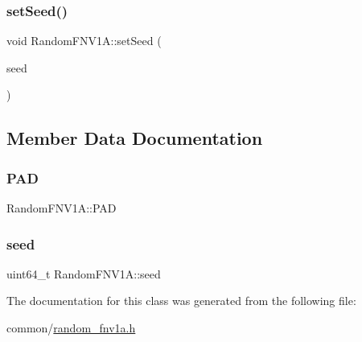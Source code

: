 \mbox{\label{classRandomFNV1A_a8fa32c70622235889cde300c7b8adb10}} 
\subsubsection{\texorpdfstring{set\+Seed()}{setSeed()}}
{\footnotesize\ttfamily void Random\+F\+N\+V1\+A\+::set\+Seed (\begin{DoxyParamCaption}\item[{uint64\+\_\+t}]{seed }\end{DoxyParamCaption})\hspace{0.3cm}{\ttfamily [inline]}}



\subsection{Member Data Documentation}
\mbox{\label{classRandomFNV1A_a587bc4df3805091170b5db5661ea8b19}} 
\subsubsection{\texorpdfstring{P\+AD}{PAD}}
{\footnotesize\ttfamily Random\+F\+N\+V1\+A\+::\+P\+AD}

\mbox{\label{classRandomFNV1A_acf505335861440a14ee0b7710586b5c1}} 
\subsubsection{\texorpdfstring{seed}{seed}}
{\footnotesize\ttfamily uint64\+\_\+t Random\+F\+N\+V1\+A\+::seed}



The documentation for this class was generated from the following file\+:\begin{DoxyCompactItemize}
\item 
common/\hyperlink{random__fnv1a_8h}{random\+\_\+fnv1a.\+h}\end{DoxyCompactItemize}
